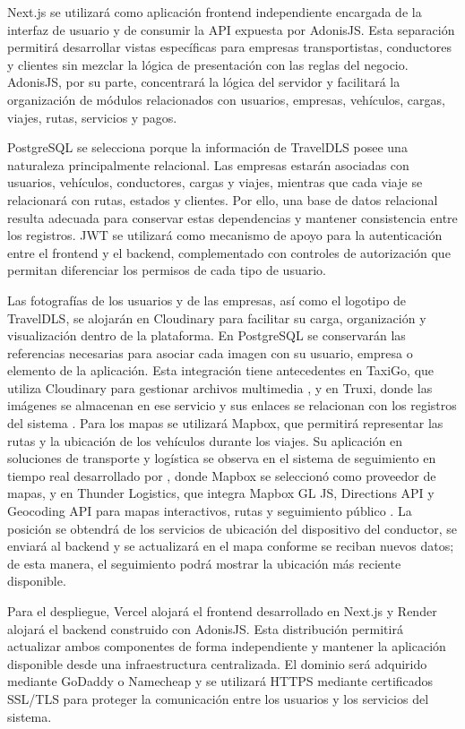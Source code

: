 Next.js se utilizará como aplicación frontend independiente encargada de la interfaz de usuario y de consumir la API expuesta por AdonisJS. Esta separación permitirá desarrollar vistas específicas para empresas transportistas, conductores y clientes sin mezclar la lógica de presentación con las reglas del negocio. AdonisJS, por su parte, concentrará la lógica del servidor y facilitará la organización de módulos relacionados con usuarios, empresas, vehículos, cargas, viajes, rutas, servicios y pagos.

PostgreSQL se selecciona porque la información de TravelDLS posee una naturaleza principalmente relacional. Las empresas estarán asociadas con usuarios, vehículos, conductores, cargas y viajes, mientras que cada viaje se relacionará con rutas, estados y clientes. Por ello, una base de datos relacional resulta adecuada para conservar estas dependencias y mantener consistencia entre los registros. JWT se utilizará como mecanismo de apoyo para la autenticación entre el frontend y el backend, complementado con controles de autorización que permitan diferenciar los permisos de cada tipo de usuario.

Las fotografías de los usuarios y de las empresas, así como el logotipo de TravelDLS, se alojarán en Cloudinary para facilitar su carga, organización y visualización dentro de la plataforma. En PostgreSQL se conservarán las referencias necesarias para asociar cada imagen con su usuario, empresa o elemento de la aplicación. Esta integración tiene antecedentes en TaxiGo, que utiliza Cloudinary para gestionar archivos multimedia \parencite{yaqoub2024taxigo}, y en Truxi, donde las imágenes se almacenan en ese servicio y sus enlaces se relacionan con los registros del sistema \parencite{vad2020truxi}. Para los mapas se utilizará Mapbox, que permitirá representar las rutas y la ubicación de los vehículos durante los viajes. Su aplicación en soluciones de transporte y logística se observa en el sistema de seguimiento en tiempo real desarrollado por \textcite{aronsson2021tracking}, donde Mapbox se seleccionó como proveedor de mapas, y en Thunder Logistics, que integra Mapbox GL JS, Directions API y Geocoding API para mapas interactivos, rutas y seguimiento público \parencite{deyheralde2026thunder}. La posición se obtendrá de los servicios de ubicación del dispositivo del conductor, se enviará al backend y se actualizará en el mapa conforme se reciban nuevos datos; de esta manera, el seguimiento podrá mostrar la ubicación más reciente disponible.

Para el despliegue, Vercel alojará el frontend desarrollado en Next.js y Render alojará el backend construido con AdonisJS. Esta distribución permitirá actualizar ambos componentes de forma independiente y mantener la aplicación disponible desde una infraestructura centralizada. El dominio será adquirido mediante GoDaddy o Namecheap y se utilizará HTTPS mediante certificados SSL/TLS para proteger la comunicación entre los usuarios y los servicios del sistema.

